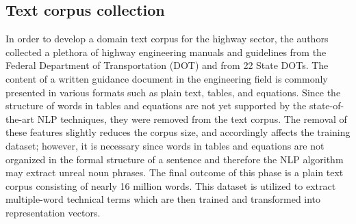 \documentclass[Journal, BackFigs,NoLists, DoubleSpace]{ascelike}%
\begin{document}
%
%
\subsection{Text corpus collection}
In order to develop a domain text corpus for the highway sector, the authors collected a plethora of highway engineering manuals and guidelines from the Federal Department of Transportation (DOT) and from 22 State DOTs. The content of a written guidance document in the engineering field is commonly presented in various formats such as plain text, tables, and equations. Since the structure of words in tables and equations are not yet supported by the state-of-the-art NLP techniques, they were removed from the text corpus. The removal of these features slightly reduces the corpus size, and accordingly affects the training dataset; however, it is necessary since words in tables and equations are not organized in the formal structure of a sentence and therefore the NLP algorithm may extract unreal noun phrases. The final outcome of this phase is a plain text corpus consisting of nearly 16 million words. This dataset is utilized to extract multiple-word technical terms which are then trained and transformed into representation vectors.
%
\end{document}
